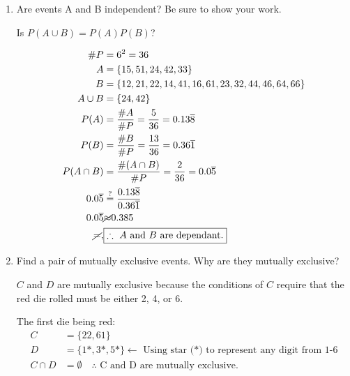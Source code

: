     \begin{enumerate}[label=(\alph*)]
        \item Are events A and B independent? Be sure to show your work.
        
        \begin{mdframed}
            Is $P(A \cup B) = P(A)P(B)$?

            \begin{align*}
                \#P & = 6^2 = 36 \\
                A & = \{15,51,24,42,33\}    \\
                B & = \{12,21,22,14,41,16,61,23,32,44,46,64,66\}    \\
                A \cup B & = \{24,42\}                              \\
                P(A) & = \frac{\#A}{\#P} = \frac{5}{36} = 0.13\overline{8}    \\
                P(B) & = \frac{\#B}{\#P} = \frac{13}{36} = 0.36\overline{1}   \\
                P(A \cap B) & = \frac{\#(A \cap B)}{\#P} = \frac{2}{36} = 0.0\overline{5}   \\
                0.0\overline{5} & \stackrel{?}{=} \frac{0.13\overline{8}}{0.36\overline{1}} \\
                0.0\overline{5} & \cancel{\approx} 0.385  \\
                \cancel{=}, & \boxed{\therefore \text{ $A$ and $B$ are dependant.}}
            \end{align*}
        \end{mdframed}

        \item  Find a pair of mutually exclusive events. Why are they mutually exclusive?
        
        \begin{mdframed}
            $C$ and $D$ are mutually exclusive because the conditions of $C$ require that the red die rolled must be either 2, 4, or 6.
        
            The first die being red:
            \begin{align*}
                C & = \{22, 61\}  \\
                D & = \{1*,3*,5*\} \leftarrow \text{ Using star (*) to represent any digit from 1-6}    \\
                C \cap D & = \emptyset \quad \boxed{\therefore \text{ C and D are mutually exclusive.}}
            \end{align*}
        \end{mdframed}


\end{enumerate}
